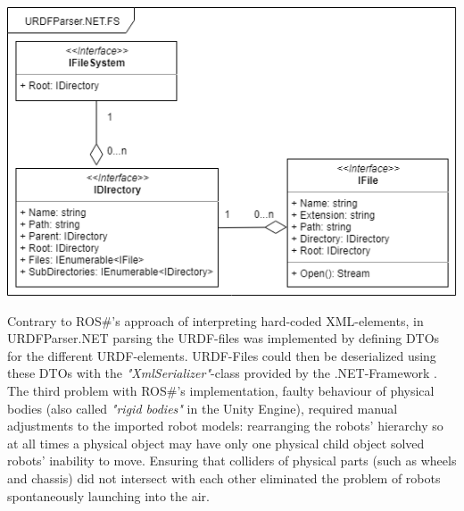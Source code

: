 \begin{center}
\noindent\includegraphics[width=14cm]{tex/img/ch05/URDFParser_FileSystemInterfaces04.png}
\label{fig:filesystem}
\end{center}
Contrary to ROS\#'s approach of interpreting hard-coded XML-elements, in URDFParser.NET parsing the URDF-files was implemented by defining \acp{DTO} for the different URDF-elements. URDF-Files could then be deserialized using these \acsp{DTO} with the \textit{"XmlSerializer"}-class provided by the .NET-Framework \cite{XmlSerializer}.\\
The third problem with ROS\#'s implementation, faulty behaviour of physical bodies (also called \textit{"rigid bodies"} in the Unity Engine), required manual adjustments to the imported robot models: rearranging the robots' hierarchy so at all times a physical object may have only one physical child object solved robots' inability to move. Ensuring that colliders of physical parts (such as wheels and chassis) did not intersect with each other eliminated the problem of robots spontaneously launching into the air. 

